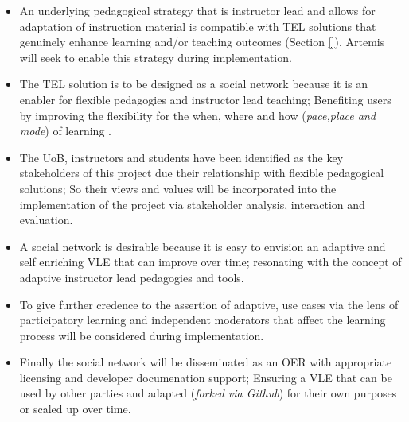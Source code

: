 \begin{itemize}

    \item An underlying pedagogical strategy that is instructor lead and allows for adaptation of instruction material is compatible with TEL solutions that genuinely enhance learning and/or teaching outcomes (Section \ref{}). Artemis will seek to enable this strategy during implementation.
    
    \item The TEL solution is to be designed as a social network because it is an enabler for flexible pedagogies and instructor lead teaching; Benefiting users by improving the flexibility for the when, where and how (\textit{pace,place and mode}) of learning .
    
    \item The UoB, instructors and students have been identified as the key stakeholders of this project due their relationship with flexible pedagogical solutions; So their views  and values will be incorporated into the implementation of the project via stakeholder analysis, interaction and evaluation.
    
    
    \item A social network is desirable because it is easy to envision an adaptive and self enriching VLE that can improve over time; resonating with the concept of adaptive instructor lead pedagogies and tools.
    
    \item To give further credence to the assertion of adaptive, use cases via the lens of participatory learning and independent moderators that affect the learning process will be considered during implementation.
    
    \item Finally the social network will be disseminated as an OER with appropriate licensing and  developer documenation support; Ensuring a VLE that can be used by other parties and adapted (\textit{forked via Github}) for their own purposes or scaled up over time.
    
\end{itemize}

    
    
    
    
